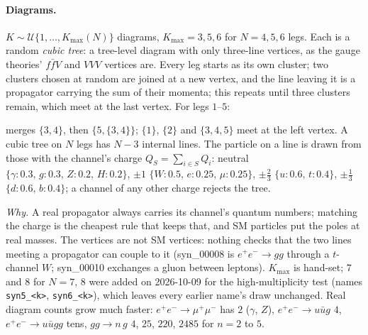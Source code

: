 \documentclass[11pt]{article}
\newcommand{\code}[1]{\texttt{#1}}
\begin{document}
\paragraph{Diagrams.} $K\sim\mathcal U\{1,\dots,K_\text{max}(N)\}$ diagrams, $K_\text{max}=3,5,6$ for $N=4,5,6$ legs.
Each is a random \emph{cubic tree}: a tree-level diagram with only three-line vertices, as the gauge theories'
$f\bar fV$ and $VVV$ vertices are. Every leg starts as its own cluster; two clusters chosen at random are joined at a
new vertex, and the line leaving it is a propagator carrying the sum of their momenta; this repeats until three
clusters remain, which meet at the last vertex. For legs $1$--$5$:
\begin{center}
\end{center}
merges $\{3,4\}$, then $\{5,\{3,4\}\}$; $\{1\}$, $\{2\}$ and $\{3,4,5\}$ meet at the left vertex. A cubic tree on $N$ legs
has $N-3$ internal lines. The particle on a line is drawn from those with the channel's charge $Q_S=\sum_{i\in S}Q_i$:
neutral $\{\gamma\!:0.3,\,g\!:0.3,\,Z\!:0.2,\,H\!:0.2\}$, $\pm1$ $\{W\!:0.5,\,e\!:0.25,\,\mu\!:0.25\}$,
$\pm\tfrac23$ $\{u\!:0.6,\,t\!:0.4\}$, $\pm\tfrac13$ $\{d\!:0.6,\,b\!:0.4\}$; a channel of any other charge rejects the tree.
\par\smallskip\noindent \emph{Why.} A real propagator always carries its channel's quantum numbers; matching the charge is the cheapest rule that
keeps that, and SM particles put the poles at real masses. The vertices are not SM vertices: nothing checks that the two
lines meeting a propagator can couple to it (syn\_00008 is $e^+e^-\to gg$ through a $t$-channel $W$; syn\_00010 exchanges
a gluon between leptons). $K_\text{max}$ is hand-set; $7$ and $8$ for $N=7$, $8$ were added on 2026-10-09 for the high-multiplicity test (names \code{syn5\_<k>}, \code{syn6\_<k>}), which leaves every earlier name's draw unchanged. Real diagram counts grow much faster: $e^+e^-\to\mu^+\mu^-$ has $2$
($\gamma$, $Z$), $e^+e^-\to u\bar ug$ $4$, $e^+e^-\to u\bar ugg$ tens, $gg\to n\,g$ $4$, $25$, $220$, $2485$ for $n=2$ to $5$.
\end{document}
